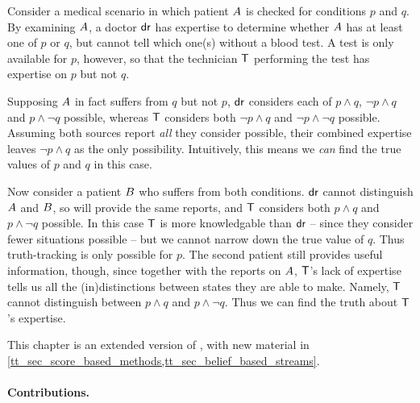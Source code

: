 \begin{example}
    \label{tt_ex_informal_example}

    Consider a medical scenario in which patient $A{}$ is checked for
    conditions $p$ and $q$. By examining $A{}$, a doctor
    $\mathsf{dr}{}$ has expertise to determine whether $A{}$ has at least one
    of $p$ or $q$, but cannot tell which one(s) without a blood test. A test is
    only available for $p$, however, so that the technician $\mathsf{T}{}$
    performing the test has expertise on $p$ but not $q$.

    Supposing $A{}$ in fact suffers from $q$ but not $p$, $\mathsf{dr}{}$
    considers each of $p \land q$, $\neg p \land q$ and $p \land \neg q$
    possible, whereas $\mathsf{T}{}$ considers both $\neg p \land q$ and $\neg p
    \land \neg q$ possible.
    Assuming both sources report \emph{all} they consider possible, their
    combined expertise leaves $\neg p \land q$ as the only
    possibility. Intuitively, this means we \emph{can} find the true values of
    $p$ and $q$ in this case.

    Now consider a patient $B{}$ who suffers from both conditions.
    $\mathsf{dr}{}$ cannot distinguish $A{}$ and $B{}$, so will provide
    the same reports, and $\mathsf{T}{}$ considers both $p \land q$ and $p \land
    \neg q$ possible. In this case $\mathsf{T}{}$ is more knowledgable than $\mathsf{dr}{}$
    -- since they consider fewer situations possible -- but we cannot narrow
    down the true value of $q$. Thus truth-tracking is only possible for $p$.
    The second patient still provides useful information, though, since
    together with the reports on $A{}$,
    $\mathsf{T}{}$'s lack of expertise tells us all the (in)distinctions between
    states they are able to make. Namely, $\mathsf{T}{}$ cannot distinguish between
    $p \land q$ and $p \land \neg q$. Thus we can find the truth about
    $\mathsf{T}{}$'s expertise.

\end{example}

This chapter is an extended version of \textcite{singleton_booth_tt_2022}, with
new material in \cref{tt_sec_score_based_methods,tt_sec_belief_based_streams}.

\paragraph{Contributions.} 

